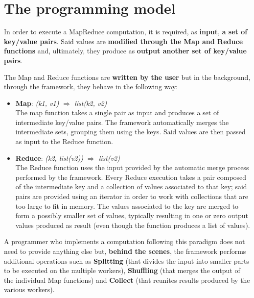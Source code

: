 \section*{The programming model}
In order to execute a MapReduce computation, it is required, as \textbf{input}, \textbf{a set of key/value pairs}. Said values are \textbf{modified through the Map and Reduce functions} and, ultimately, they produce as \textbf{output another set of key/value pairs}. 

The Map and Reduce functions are \textbf{written by the user} but in the background, through the framework, they behave in the following way:
\begin{itemize}
    \item \textbf{Map}: \textit{(k1, v1) $\Longrightarrow$ list(k2, v2)}\\
    The map function takes a single pair as input and produces a set of intermediate key/value pairs. The framework automatically merges the intermediate sets, grouping them using the keys. Said values are then passed as input to the Reduce function.
    \item \textbf{Reduce}: \textit{(k2, list(v2)) $\Longrightarrow$ list(v2)}\\
    The Reduce function uses the input provided by the automatic merge process performed by the framework. Every Reduce execution takes a pair composed of the intermediate key and a collection of values associated to that key; said pairs are provided using an iterator in order to work with collections that are too large to fit in memory. The values associated to the key are merged to form a possibly smaller set of values, typically resulting in one or zero output values produced as result (even though the function produces a list of values).
\end{itemize}
A programmer who implements a computation following this paradigm does not need to provide anything else but, \textbf{behind the scenes}, the framework performs additional operations such as \textbf{Splitting} (that divides the input into smaller parts to be executed on the multiple workers), \textbf{Shuffling} (that merges the output of the individual Map functions) and \textbf{Collect} (that reunites results produced by the various workers).
